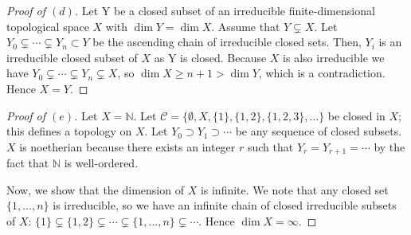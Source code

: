 \documentclass[12pt,letterpaper]{article}
\theoremstyle{definition}
\theoremstyle{remark}
\numberwithin{equation}{section}
\numberwithin{figure}{problem}
\begin{document}
\begin{proof}[Proof of $(d)$]
	Let Y be a closed subset of an irreducible finite-dimensional topological space $X$ with $\dim Y = \dim X$. 
	Assume that $Y \subsetneq X$. Let $Y_0 \subsetneq \cdots \subsetneq Y_n
  \subset Y$ be the ascending chain of irreducible closed sets. Then, $Y_i$ is
  an irreducible closed subset of $X$ as Y is closed. Because $X$ is also irreducible we have $Y_0 \subsetneq \cdots \subsetneq Y_n \subsetneq X$, so $\dim X \geq n+1 > \dim Y$, which is a contradiction. Hence $X = Y$. 
\end{proof}
\begin{proof}[Proof of $(e)$]
  Let $X = \mathbb{N}$. Let $\mathscr{C} = \{ \emptyset, X, \{1\},
  \{1,2\}, \{1,2,3\},\ldots\}$ be closed in $X$; this defines a topology on $X$.
	Let $Y_0 \supset Y_1 \supset \cdots$ be any sequence of closed subsets.
  $X$ is noetherian because there exists an integer $r$ such that $Y_r = Y_{r+1}
  = \cdots$ by the fact that $\mathbb{N}$ is well-ordered. 
	\par Now, we show that the dimension of $X$ is infinite.
  We note that any closed set $\{1, \ldots,n\}$ is irreducible, so we have an
  infinite chain of closed irreducible subsets of $X$: $\{1\} \subsetneq \{1,2\}
  \subsetneq \cdots \subsetneq \{1,\ldots,n\} \subsetneq \cdots$. Hence $\dim X
  = \infty$.
\end{proof}
\end{document}
